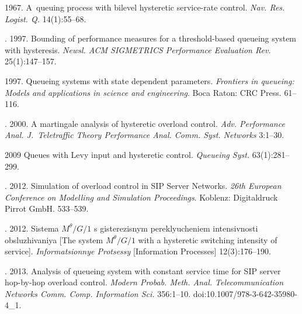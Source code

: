   \begin{multicols}{2}

\renewcommand{\bibname}{\protect\rmfamily References}

{\small\frenchspacing
{%
\begin{thebibliography}{99}




 1967.
A~queuing process with bilevel hysteretic
service-rate control. \textit{Nav. Res. Logist. Q.} 14(1):55--68.

. 1997.
Bounding of performance measures for a
threshold-based queueing system with hysteresis.
\textit{Newsl. ACM SIGMETRICS Performance Evaluation Rev.}
25(1):147--157.

 1997.
Queueing systems with state dependent parameters.
\textit{Frontiers in queueing: Models and applications in
science and engineering}. Boca Raton: CRC Press. 61--116.

. 2000.
A martingale analysis of hysteretic overload
control. \textit{Adv. Performance Anal. J.~Teletraffic Theory
Performance Anal.
Comm. Syst. Networks} 3:1--30.

 2009
Queues with Levy input and hysteretic control.
\textit{Queueing Syst.} 63(1):281--299.


. 2012.
Simulation of overload control in SIP Server
Networks. \textit{26th European Conference on
Modelling and Simulation Proceedings}.
Koblenz: Digitaldruck Pirrot GmbH. 533--539.

. 2012.
Sistema $M^\theta/G/1$ s gisterezisnym
pereklyucheniem intensiv\-nosti obsluzhivaniya
[The system $M^\theta/G/1$  with a hysteretic switching intensity of service].
\textit{Informatsionnye Protsessy} [Information Processes]
12(3):176--190.

. 2013.
Analysis of queueing system with constant service
time for SIP server hop-by-hop overload control. \textit{Modern
Probab. Meth. Anal. Telecommunication Networks
Comm. Comp. Information Sci.}
356:1--10. doi:10.1007/978-3-642-35980-4\_1.


\end{thebibliography}}}
\end{multicols}
